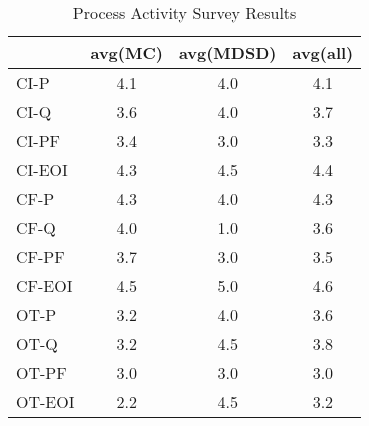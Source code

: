 \documentclass[final_report_innit.tex]{subfiles}
\begin{document}
\begin{table}[h]
\caption{Process Activity Survey Results}
\centering
\begin{tabular}{@{}l|c|c|c|@{}}
\cmidrule(l){2-4}
                             & \multicolumn{1}{l|}{avg(MC)} & \multicolumn{1}{l|}{avg(MDSD)} & \multicolumn{1}{l|}{avg(all)} \\ \midrule
\multicolumn{1}{|l|}{CI-P}   & 4.1                          & 4.0                           & 4.1                           \\ \midrule
\multicolumn{1}{|l|}{CI-Q}   & 3.6                          & 4.0                           & 3.7                           \\ \midrule
\multicolumn{1}{|l|}{CI-PF}  & 3.4                          & 3.0                           & 3.3                           \\ \midrule
\multicolumn{1}{|l|}{CI-EOI} & 4.3                          & 4.5                           & 4.4                           \\ \midrule
\multicolumn{1}{|l|}{CF-P}   & 4.3                          & 4.0                           & 4.3                           \\ \midrule
\multicolumn{1}{|l|}{CF-Q}   & 4.0                          & 1.0                           & 3.6                           \\ \midrule
\multicolumn{1}{|l|}{CF-PF}  & 3.7                          & 3.0                           & 3.5                           \\ \midrule
\multicolumn{1}{|l|}{CF-EOI} & 4.5                          & 5.0                           & 4.6                           \\ \midrule
\multicolumn{1}{|l|}{OT-P}   & 3.2                          & 4.0                           & 3.6                           \\ \midrule
\multicolumn{1}{|l|}{OT-Q}   & 3.2                          & 4.5                           & 3.8                           \\ \midrule
\multicolumn{1}{|l|}{OT-PF}  & 3.0                          & 3.0                           & 3.0                           \\ \midrule
\multicolumn{1}{|l|}{OT-EOI} & 2.2                          & 4.5                           & 3.2                           \\ \bottomrule
\end{tabular}
\end{table}
\end{document}
